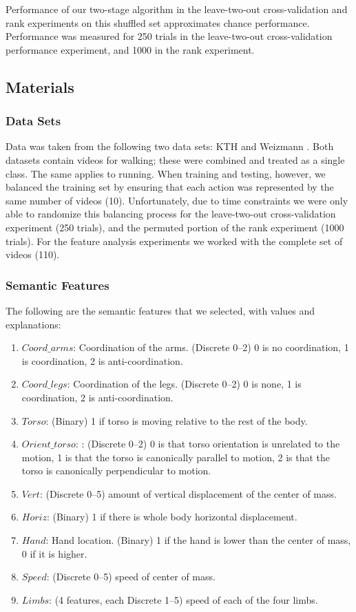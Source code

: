 \documentclass{article}
\begin{document}
Performance of our two-stage algorithm in the leave-two-out cross-validation and rank experiments on this shuffled set approximates chance performance. Performance was measured for 250 trials in the leave-two-out cross-validation performance experiment, and 1000 in the rank experiment.
\label{stats}

\subsection{Materials}
\subsubsection{Data Sets}
Data was taken from the following two data sets: KTH \cite{kth} and Weizmann \cite{weizmann}. Both datasets contain videos for walking; these were combined and treated as a single class. The same applies to running.  When training and testing, however, we balanced the training set by ensuring that each action was represented by the same number of videos (10). Unfortunately, due to time constraints we were only able to randomize this balancing process for the leave-two-out cross-validation experiment (250 trials), and the permuted portion of the rank experiment (1000 trials). For the feature analysis experiments we worked with the complete set of videos (110).

\subsubsection{Semantic Features}
\label{sf}
The following are the semantic features that we selected, with values and explanations:
\begin{enumerate}
\item
$Coord\_arms$: Coordination of the arms. (Discrete 0--2) 0 is no coordination, 1 is coordination, 2 is anti-coordination.
\item
$Coord\_legs$: Coordination of the legs. (Discrete 0--2) 0 is none, 1 is coordination, 2 is anti-coordination.
\item
$Torso$: (Binary) 1 if torso is moving relative to the rest of the body.
\item
$Orient\_torso$: : (Discrete 0--2) 0 is that torso orientation is unrelated to the motion, 1 is that the torso is canonically parallel to motion, 2 is that the torso is canonically perpendicular to motion.
\item
$Vert$: (Discrete 0--5) amount of vertical displacement of the center of mass.
\item
$Horiz$: (Binary) 1 if there is whole body horizontal displacement.
\item
$Hand$: Hand location. (Binary) 1 if the hand is lower than the center of mass, 0 if it is higher.
\item
$Speed$: (Discrete 0--5) speed of center of mass.
\item
$Limbs$: (4 features, each Discrete 1--5) speed of each of the four limbs.
\end{enumerate}
\end{document}
